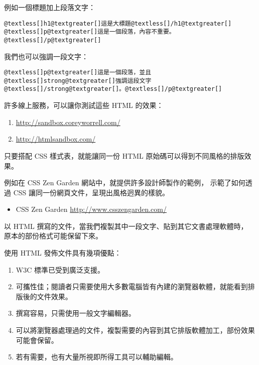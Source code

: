 \documentclass[a4paper,12pt,english]{sphinxmanual}
\begin{document}
例如一個標題加上段落文字：

\begin{Verbatim}[commandchars=@\[\]]
@textless[]h1@textgreater[]這是大標題@textless[]/h1@textgreater[]
@textless[]p@textgreater[]這是一個段落，內容不重要。@textless[]/p@textgreater[]
\end{Verbatim}

我們也可以強調一段文字：

\begin{Verbatim}[commandchars=@\[\]]
@textless[]p@textgreater[]這是一個段落，並且@textless[]strong@textgreater[]強調這段文字@textless[]/strong@textgreater[]。@textless[]/p@textgreater[]
\end{Verbatim}

許多線上服務，可以讓你測試這些 HTML 的效果：
\begin{enumerate}
\item {} 
\href{http://sandbox.coreyworrell.com/}{http://sandbox.coreyworrell.com/}

\item {} 
\href{http://htmlsandbox.com/}{http://htmlsandbox.com/}

\end{enumerate}

只要搭配 CSS 樣式表，就能讓同一份 HTML 原始碼可以得到不同風格的排版效果。

例如在 CSS Zen Garden 網站中，就提供許多設計師製作的範例，
示範了如何透過 CSS 讓同一份網頁文件，呈現出風格迥異的樣貌。
\begin{itemize}
\item {} 
CSS Zen Garden \href{http://www.csszengarden.com/}{http://www.csszengarden.com/}

\end{itemize}

以 HTML 撰寫的文件，當我們複製其中一段文字、貼到其它文書處理軟體時，
原本的部份格式可能保留下來。

使用 HTML 發佈文件具有幾項優點：
\begin{enumerate}
\item {} 
W3C 標準已受到廣泛支援。

\item {} 
可攜性佳；閱讀者只需要使用大多數電腦皆有內建的瀏覽器軟體，就能看到排版後的文件效果。

\item {} 
撰寫容易，只需使用一般文字編輯器。

\item {} 
可以將瀏覽器處理過的文件，複製需要的內容到其它排版軟體加工，部份效果可能會保留。

\item {} 
若有需要，也有大量所視即所得工具可以輔助編輯。

\end{enumerate}
\end{document}
